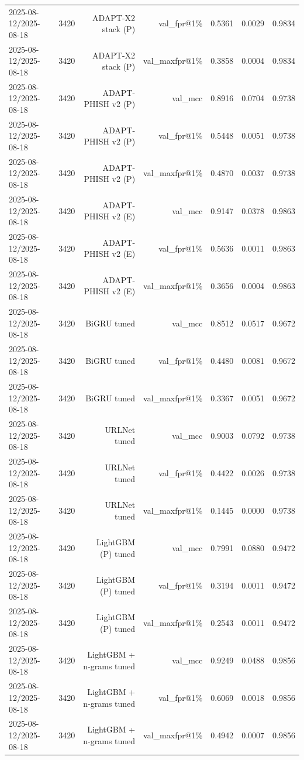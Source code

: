 \begin{table}[t]
\begin{tabular}{llrrrrr}
2025-08-12/2025-08-18 & 3420 & ADAPT-X2 stack (P) & val\_fpr@1\% & 0.5361 & 0.0029 & 0.9834 \\
2025-08-12/2025-08-18 & 3420 & ADAPT-X2 stack (P) & val\_maxfpr@1\% & 0.3858 & 0.0004 & 0.9834 \\
2025-08-12/2025-08-18 & 3420 & ADAPT-PHISH v2 (P) & val\_mcc & 0.8916 & 0.0704 & 0.9738 \\
2025-08-12/2025-08-18 & 3420 & ADAPT-PHISH v2 (P) & val\_fpr@1\% & 0.5448 & 0.0051 & 0.9738 \\
2025-08-12/2025-08-18 & 3420 & ADAPT-PHISH v2 (P) & val\_maxfpr@1\% & 0.4870 & 0.0037 & 0.9738 \\
2025-08-12/2025-08-18 & 3420 & ADAPT-PHISH v2 (E) & val\_mcc & 0.9147 & 0.0378 & 0.9863 \\
2025-08-12/2025-08-18 & 3420 & ADAPT-PHISH v2 (E) & val\_fpr@1\% & 0.5636 & 0.0011 & 0.9863 \\
2025-08-12/2025-08-18 & 3420 & ADAPT-PHISH v2 (E) & val\_maxfpr@1\% & 0.3656 & 0.0004 & 0.9863 \\
2025-08-12/2025-08-18 & 3420 & BiGRU tuned & val\_mcc & 0.8512 & 0.0517 & 0.9672 \\
2025-08-12/2025-08-18 & 3420 & BiGRU tuned & val\_fpr@1\% & 0.4480 & 0.0081 & 0.9672 \\
2025-08-12/2025-08-18 & 3420 & BiGRU tuned & val\_maxfpr@1\% & 0.3367 & 0.0051 & 0.9672 \\
2025-08-12/2025-08-18 & 3420 & URLNet tuned & val\_mcc & 0.9003 & 0.0792 & 0.9738 \\
2025-08-12/2025-08-18 & 3420 & URLNet tuned & val\_fpr@1\% & 0.4422 & 0.0026 & 0.9738 \\
2025-08-12/2025-08-18 & 3420 & URLNet tuned & val\_maxfpr@1\% & 0.1445 & 0.0000 & 0.9738 \\
2025-08-12/2025-08-18 & 3420 & LightGBM (P) tuned & val\_mcc & 0.7991 & 0.0880 & 0.9472 \\
2025-08-12/2025-08-18 & 3420 & LightGBM (P) tuned & val\_fpr@1\% & 0.3194 & 0.0011 & 0.9472 \\
2025-08-12/2025-08-18 & 3420 & LightGBM (P) tuned & val\_maxfpr@1\% & 0.2543 & 0.0011 & 0.9472 \\
2025-08-12/2025-08-18 & 3420 & LightGBM + n-grams tuned & val\_mcc & 0.9249 & 0.0488 & 0.9856 \\
2025-08-12/2025-08-18 & 3420 & LightGBM + n-grams tuned & val\_fpr@1\% & 0.6069 & 0.0018 & 0.9856 \\
2025-08-12/2025-08-18 & 3420 & LightGBM + n-grams tuned & val\_maxfpr@1\% & 0.4942 & 0.0007 & 0.9856 \\

\end{tabular}
\end{table}
